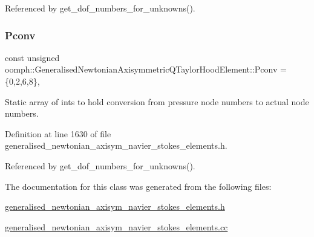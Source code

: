 Referenced by get\+\_\+dof\+\_\+numbers\+\_\+for\+\_\+unknowns().

\mbox{\label{classoomph_1_1GeneralisedNewtonianAxisymmetricQTaylorHoodElement_a42e06643d26b39a2683f3fa7ee696792}} 
\subsubsection{\texorpdfstring{Pconv}{Pconv}}
{\footnotesize\ttfamily const unsigned oomph\+::\+Generalised\+Newtonian\+Axisymmetric\+Q\+Taylor\+Hood\+Element\+::\+Pconv =\{0,2,6,8\}\hspace{0.3cm}{\ttfamily [static]}, {\ttfamily [protected]}}



Static array of ints to hold conversion from pressure node numbers to actual node numbers. 



Definition at line 1630 of file generalised\+\_\+newtonian\+\_\+axisym\+\_\+navier\+\_\+stokes\+\_\+elements.\+h.



Referenced by get\+\_\+dof\+\_\+numbers\+\_\+for\+\_\+unknowns().



The documentation for this class was generated from the following files\+:\begin{DoxyCompactItemize}
\item 
\hyperlink{generalised__newtonian__axisym__navier__stokes__elements_8h}{generalised\+\_\+newtonian\+\_\+axisym\+\_\+navier\+\_\+stokes\+\_\+elements.\+h}\item 
\hyperlink{generalised__newtonian__axisym__navier__stokes__elements_8cc}{generalised\+\_\+newtonian\+\_\+axisym\+\_\+navier\+\_\+stokes\+\_\+elements.\+cc}\end{DoxyCompactItemize}
